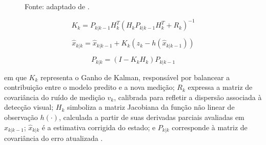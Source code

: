 \begin{figure}[H]

\vspace{0.2cm}

\begin{flushleft}
\footnotesize Fonte: adaptado de \cite{kalman_beginners}.
\end{flushleft}

\end{figure}

\begin{equation}
K_k =
P_{k|k-1}
H_k^T
\left(
H_k
P_{k|k-1}
H_k^T
+
R_k
\right)^{-1}
\label{eq:kalman_gain}
\end{equation}

\begin{equation}
\hat{x}_{k|k}
=
\hat{x}_{k|k-1}
+
K_k
\left(
z_k-h(\hat{x}_{k|k-1})
\right)
\label{eq:state_update}
\end{equation}

\begin{equation}
P_{k|k}
=
(I-K_kH_k)
P_{k|k-1}
\label{eq:covariance_update}
\end{equation}

\noindent em que $K_k$ representa o Ganho de Kalman, responsável por balancear a contribuição entre o modelo predito e a nova medição; $R_k$ expressa a matriz de covariância do ruído de medição $v_k$, calibrada para refletir a dispersão associada à detecção visual; $H_k$ simboliza a matriz Jacobiana da função não linear de observação $h(\cdot)$, calculada a partir de suas derivadas parciais avaliadas em $\hat{x}_{k|k-1}$; $\hat{x}_{k|k}$ é a estimativa corrigida do estado; e $P_{k|k}$ corresponde à matriz de covariância do erro atualizada \cite{kalman_beginners}.


